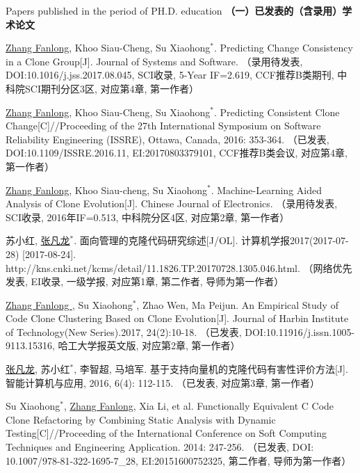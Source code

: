 
 {Papers
published in the period of PH.D. education}
\noindent\textbf{（一）已发表的（含录用）学术论文}
\begin{publist}

\item
\underline{Zhang Fanlong}, Khoo Siau-Cheng, Su Xiaohong{$^*$}. Predicting Change Consistency in a Clone Group[J]. Journal of Systems and Software.
（录用待发表, DOI:10.1016/j.jss.2017.08.045, SCI收录,  5-Year IF=2.619, CCF推荐B类期刊, 中科院SCI期刊分区3区, 对应第4章, 第一作者）
\item
\underline{Zhang Fanlong}, Khoo Siau-Cheng, Su Xiaohong{$^*$}. Predicting Consistent Clone Change[C]//Proceeding of the 27th International Symposium on Software Reliability Engineering (ISSRE), Ottawa, Canada, 2016: 353-364.
（已发表, DOI:10.1109/ISSRE.2016.11, EI:20170803379101, CCF推荐B类会议, 对应第4章, 第一作者）
%
\item
\underline{Zhang Fanlong}, Khoo Siau-cheng, Su Xiaohong{$^*$}. Machine-Learning Aided Analysis of Clone Evolution[J]. Chinese Journal of Electronics. 
（录用待发表, SCI收录, 2016年IF=0.513, 中科院分区4区, 对应第2章, 第一作者）

\item
苏小红, \underline{张凡龙}{$^*$}. 面向管理的克隆代码研究综述[J/OL]. 计算机学报2017(2017-07-28) [2017-08-24]. http://kns.cnki.net/kcms/detail/11.1826.TP.20170728.1305.046.html.
（网络优先发表, EI收录, 一级学报, 对应第1章, 第二作者, 导师为第一作者）

\item
\underline{Zhang Fanlong }, Su Xiaohong{$^*$},  Zhao Wen,  Ma Peijun. An Empirical Study of Code Clone Clustering Based on Clone Evolution[J]. Journal of Harbin Institute of Technology(New Series).2017, 24(2):10-18.
（已发表, DOI:10.11916/j.issn.1005-9113.15316, 哈工大学报英文版, 对应第2章, 第一作者）

\item
\underline{张凡龙}, 苏小红{$^*$},  李智超,  马培军. 基于支持向量机的克隆代码有害性评价方法[J]. 智能计算机与应用, 2016, 6(4): 112-115. 
（已发表, 对应第3章, 第一作者）

\item
Su Xiaohong{$^*$}, \underline{Zhang Fanlong},  Xia Li, et al. Functionally Equivalent C Code Clone Refactoring by Combining Static Analysis with Dynamic Testing[C]//Proceeding of the International Conference on Soft Computing Techniques and Engineering Application. 2014: 247-256.
（已发表, DOI: 10.1007/978-81-322-1695-7\_28, EI:20151600752325, 第二作者, 导师为第一作者）
\end{publist}

